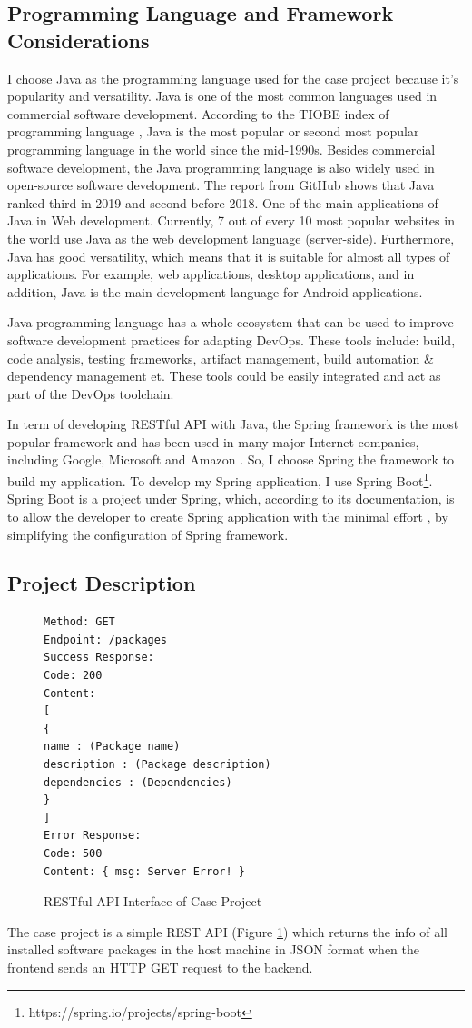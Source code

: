 \subsection{Programming Language and Framework Considerations}
I choose Java as the programming language used for the case project because it's popularity and versatility.
Java is one of the most common languages used in commercial software development. According to the TIOBE index of programming language \cite{indexTIO42:online}, Java is the most popular or second most popular programming language in the world since the mid-1990s. Besides commercial software development, the Java programming language is also widely used in open-source software development. The report \cite{TheState3:online} from GitHub shows that Java ranked third in 2019 and second before 2018. One of the main applications of Java in Web development. Currently, 7 out of every 10 \cite{Programm17:online} most popular websites in the world use Java as the web development language (server-side). Furthermore, Java has good versatility, which means that it is suitable for almost all types of applications. For example, web applications, desktop applications, and in addition, Java is the main development language for Android applications.
\par
Java programming language has a whole ecosystem that can be used to improve software development practices for adapting DevOps. These tools include: build, code analysis, testing frameworks, artifact management, build automation \& dependency management et. These tools could be easily integrated and act as part of the DevOps toolchain.
\par
In term of developing RESTful API with Java, the Spring framework is the most popular framework and has been used in many major Internet companies, including Google, Microsoft and Amazon \cite{SpringWh14:online}.
So, I choose Spring the framework to build my application. To develop my Spring application, I use Spring Boot\footnote{https://spring.io/projects/spring-boot}. Spring Boot is a project under Spring, which, according to its documentation, is to allow the developer to create Spring application with the minimal effort \cite{SpringBo84:online}, by simplifying the configuration of Spring framework.
\subsection{Project Description}
\begin{figure}[!h]
\begin{verbatim}
Method: GET
Endpoint: /packages
Success Response:
Code: 200
Content:
[
{
name : (Package name)
description : (Package description)
dependencies : (Dependencies)
}
]
Error Response:
Code: 500
Content: { msg: Server Error! }
\end{verbatim}
\label{fig:rest}
\caption{RESTful API Interface of Case Project}
\end{figure}
The case project is a simple REST API (Figure \ref{fig:rest}) which returns the info of all installed software packages in the host machine in JSON format when the frontend sends an HTTP GET request to the backend.
